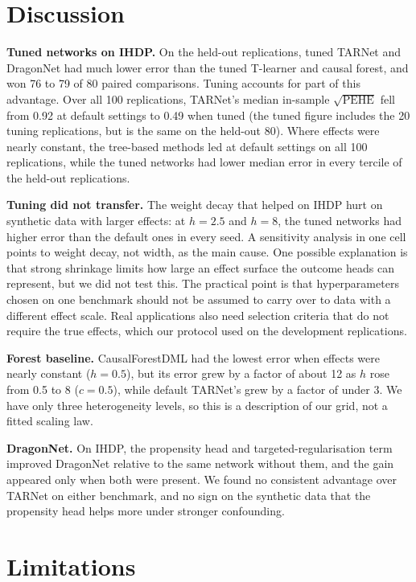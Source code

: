 \documentclass[10pt]{article}
\begin{document}
\section{Discussion}

\textbf{Tuned networks on IHDP.} On the held-out replications, tuned TARNet and DragonNet had much lower error than the tuned T-learner and causal forest, and won 76 to 79 of 80 paired comparisons. Tuning accounts for part of this advantage. Over all 100 replications, TARNet's median in-sample $\sqrt{\mathrm{PEHE}}$ fell from 0.92 at default settings to 0.49 when tuned (the tuned figure includes the 20 tuning replications, but is the same on the held-out 80). Where effects were nearly constant, the tree-based methods led at default settings on all 100 replications, while the tuned networks had lower median error in every tercile of the held-out replications.

\textbf{Tuning did not transfer.} The weight decay that helped on IHDP hurt on synthetic data with larger effects: at $h=2.5$ and $h=8$, the tuned networks had higher error than the default ones in every seed. A sensitivity analysis in one cell points to weight decay, not width, as the main cause. One possible explanation is that strong shrinkage limits how large an effect surface the outcome heads can represent, but we did not test this. The practical point is that hyperparameters chosen on one benchmark should not be assumed to carry over to data with a different effect scale. Real applications also need selection criteria that do not require the true effects, which our protocol used on the development replications.

\textbf{Forest baseline.} CausalForestDML had the lowest error when effects were nearly constant ($h=0.5$), but its error grew by a factor of about 12 as $h$ rose from 0.5 to 8 ($c=0.5$), while default TARNet's grew by a factor of under 3. We have only three heterogeneity levels, so this is a description of our grid, not a fitted scaling law.

\textbf{DragonNet.} On IHDP, the propensity head and targeted-regularisation term improved DragonNet relative to the same network without them, and the gain appeared only when both were present. We found no consistent advantage over TARNet on either benchmark, and no sign on the synthetic data that the propensity head helps more under stronger confounding.

\section{Limitations}
\end{document}
